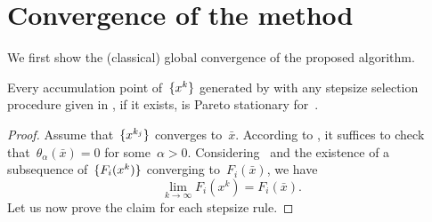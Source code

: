 \documentclass[../main]{subfiles}
\begin{document}
\section{Convergence of the method} 
We first show the (classical) global convergence of the proposed algorithm.
\begin{theorem} 
    Every accumulation point of~$\lbrace x^k\rbrace$ generated by  with any stepsize selection procedure given in , if it exists, is Pareto stationary for~.
\end{theorem}
\begin{proof}
    Assume that~$\lbrace x^{k_j}\rbrace$ converges to~$\bar{x}$.
    According to , it suffices to check that~$\theta_\alpha(\bar{x}) = 0$ for some~$\alpha > 0$.
    Considering~ and the existence of a subsequence of~$\lbrace F_i(x^k)\rbrace$ converging to~$F_i(\bar{x})$, we have
    \begin{equation} \label{eq:pgm_stationary:convergence}
        \lim_{k \to \infty} F_i(x^k) = F_i(\bar{x})
    .\end{equation}
    Let us now prove the claim for each stepsize rule.


\end{proof}
\end{document}
